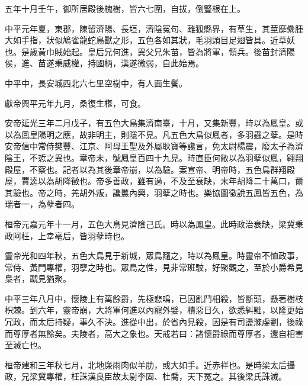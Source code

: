 \begin{pinyinscope}
五年十月壬午，御所居殿後槐樹，皆六七圍，自拔，倒豎根在上。

中平元年夏，東郡，陳留濟陽、長垣，濟陰冤句、離狐縣界，有草生，其莖靡纍腫大如手指，狀似鳩雀龍蛇鳥獸之形，五色各如其狀，毛羽頭目足翅皆具。近草妖也。是歲黃巾賊始起。皇后兄何進，異父兄朱苗，皆為將軍，領兵。後苗封濟陽侯，進、苗遂秉威權，持國柄，漢遂微弱，自此始焉。

中平中，長安城西北六七里空樹中，有人面生鬢。

獻帝興平元年九月，桑復生椹，可食。

安帝延光三年二月戊子，有五色大鳥集濟南臺，十月，又集新豐，時以為鳳皇。或以為鳳皇陽明之應，故非明主，則隱不見。凡五色大鳥似鳳者，多羽蟲之孽。是時安帝信中常侍樊豐、江京、阿母王聖及外屬耿寶等讒言，免太尉楊震，廢太子為濟陰王，不悊之異也。章帝末，號鳳皇百四十九見。時直臣何敞以為羽孽似鳳，翱翔殿屋，不察也。記者以為其後章帝崩，以為驗。案宣帝、明帝時，五色鳥群翔殿屋，賈逵以為胡降徵也。帝多善政，雖有過，不及至衰缺，末年胡降二十萬口，爾其驗也。帝之時，羌胡外叛，讒慝內興，羽孽之時也。樂協圖徵說五鳳皆五色，為瑞者一，為孽者四。

桓帝元嘉元年十一月，五色大鳥見濟陰己氏。時以為鳳皇。此時政治衰缺，梁冀秉政阿枉，上幸亳后，皆羽孽時也。

靈帝光和四年秋，五色大鳥見于新城，眾鳥隨之，時以為鳳皇。時靈帝不恤政事，常侍、黃門專權，羽孽之時也。眾鳥之性，見非常班駮，好聚觀之，至於小爵希見梟者，虣見猶聚。

中平三年八月中，懷陵上有萬餘爵，先極悲鳴，已因亂鬥相殺，皆斷頭，懸著樹枝枳棘。到六年，靈帝崩，大將軍何進以內寵外嬖，積惡日久，欲悉糾黜，以隆更始冗政，而太后持疑，事久不決。進從中出，於省內見殺，因是有司盪滌虔劉，後祿而尊厚者無餘矣。夫陵者，高大之象也。天戒若曰：諸懷爵祿而尊厚者，還自相害至滅亡也。

桓帝建和三年秋七月，北地廉雨肉似羊肋，或大如手。近赤祥也。是時梁太后攝政，兄梁冀專權，枉誅漢良臣故太尉李固、杜喬，天下冤之。其後梁氏誅滅。


\end{pinyinscope}